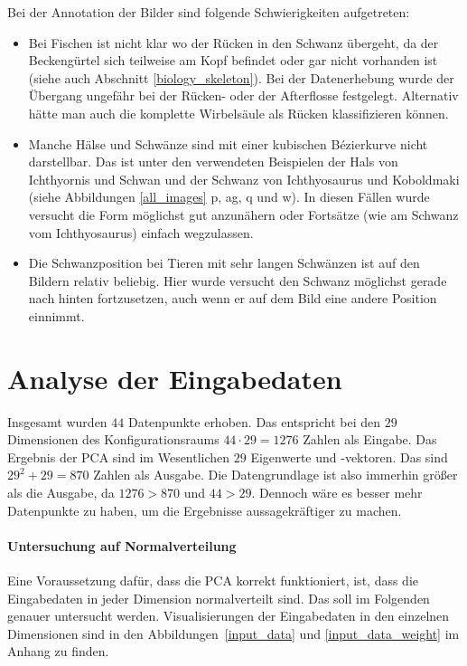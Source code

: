  Bei der Annotation der Bilder sind folgende Schwierigkeiten aufgetreten:
 \begin{itemize}
  \item Bei Fischen ist nicht klar wo der Rücken in den Schwanz übergeht, da der Beckengürtel sich teilweise am Kopf befindet oder gar nicht vorhanden ist (siehe auch Abschnitt \ref{biology_skeleton}). Bei der Datenerhebung wurde der Übergang ungefähr bei der Rücken- oder der Afterflosse festgelegt. Alternativ hätte man auch die komplette Wirbelsäule als Rücken klassifizieren können.
  
  \item Manche Hälse und Schwänze sind mit einer kubischen Bézierkurve nicht darstellbar. Das ist unter den verwendeten Beispielen der Hals von Ichthyornis und Schwan und der Schwanz von Ichthyosaurus und Koboldmaki (siehe Abbildungen \ref{all_images} p, ag, q und w). In diesen Fällen wurde versucht die Form möglichst gut anzunähern oder Fortsätze (wie am Schwanz vom Ichthyosaurus) einfach wegzulassen.
  
  \item Die Schwanzposition bei Tieren mit sehr langen Schwänzen ist auf den Bildern relativ beliebig. Hier wurde versucht den Schwanz möglichst gerade nach hinten fortzusetzen, auch wenn er auf dem Bild eine andere Position einnimmt.
 \end{itemize}
 
 
 \section{Analyse der Eingabedaten}
 \label{pca_input_analysis}
 
 Insgesamt wurden $44$ Datenpunkte erhoben. Das entspricht bei den $29$ Dimensionen des Konfigurationsraums $44 \cdot 29 = 1276$ Zahlen als Eingabe. Das Ergebnis der PCA sind im Wesentlichen $29$ Eigenwerte und -vektoren. Das sind $29^2 + 29 = 870$ Zahlen als Ausgabe. Die Datengrundlage ist also immerhin größer als die Ausgabe, da $1276 > 870$ und $44 > 29$. Dennoch wäre es besser mehr Datenpunkte zu haben, um die Ergebnisse aussagekräftiger zu machen.
 
 \paragraph{Untersuchung auf Normalverteilung}
 Eine Voraussetzung dafür, dass die PCA korrekt funktioniert, ist, dass die Eingabedaten in jeder Dimension normalverteilt sind. Das soll im Folgenden genauer untersucht werden. Visualisierungen der Eingabedaten in den einzelnen Dimensionen sind in den Abbildungen~\ref{input_data} und \ref{input_data_weight} im Anhang zu finden.
 

